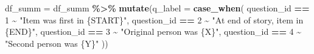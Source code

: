 \documentclass[
]{article}
\newenvironment{Shaded}{\begin{snugshade}}{\end{snugshade}}
\newcommand{\AttributeTok}[1]{\textcolor[rgb]{0.13,0.29,0.53}{#1}}
\newcommand{\DecValTok}[1]{\textcolor[rgb]{0.00,0.00,0.81}{#1}}
\newcommand{\FunctionTok}[1]{\textcolor[rgb]{0.13,0.29,0.53}{\textbf{#1}}}
\newcommand{\NormalTok}[1]{#1}
\newcommand{\OtherTok}[1]{\textcolor[rgb]{0.56,0.35,0.01}{#1}}
\newcommand{\SpecialCharTok}[1]{\textcolor[rgb]{0.81,0.36,0.00}{\textbf{#1}}}
\newcommand{\StringTok}[1]{\textcolor[rgb]{0.31,0.60,0.02}{#1}}
\begin{document}
\begin{Shaded}
\begin{Highlighting}[]
\NormalTok{df\_summ }\OtherTok{=}\NormalTok{ df\_summ }\SpecialCharTok{\%\textgreater{}\%}
  \FunctionTok{mutate}\NormalTok{(}\AttributeTok{q\_label =} \FunctionTok{case\_when}\NormalTok{(}
\NormalTok{    question\_id }\SpecialCharTok{==} \DecValTok{1} \SpecialCharTok{\textasciitilde{}} \StringTok{"Item was first in \{START\}"}\NormalTok{,}
\NormalTok{    question\_id }\SpecialCharTok{==} \DecValTok{2} \SpecialCharTok{\textasciitilde{}} \StringTok{"At end of story, item in \{END\}"}\NormalTok{,}
\NormalTok{    question\_id }\SpecialCharTok{==} \DecValTok{3} \SpecialCharTok{\textasciitilde{}} \StringTok{"Original person was \{X\}"}\NormalTok{,}
\NormalTok{    question\_id }\SpecialCharTok{==} \DecValTok{4} \SpecialCharTok{\textasciitilde{}} \StringTok{"Second person was \{Y\}"}
\NormalTok{  ))}


\end{Highlighting}
\end{Shaded}
\end{document}
